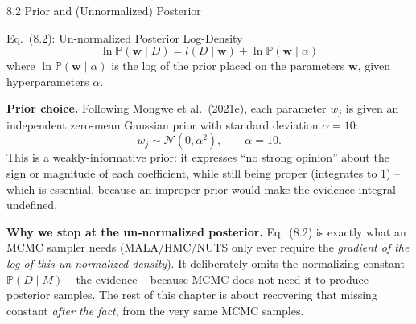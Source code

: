 \documentclass[aspectratio=169,10pt]{beamer}
\begin{document}
\begin{frame}[allowframebreaks]{8.2 Prior and (Unnormalized) Posterior}

\begin{block}{Eq.\ (8.2): Un-normalized Posterior Log-Density}
\[
\ln \mathbb{P}(\mathbf{w} \mid D) = l(D \mid \mathbf{w}) + \ln \mathbb{P}(\mathbf{w} \mid \alpha)
\]
where $\ln \mathbb{P}(\mathbf{w}\mid\alpha)$ is the log of the prior placed on the parameters $\mathbf{w}$, given hyperparameters $\alpha$.
\end{block}

\textbf{Prior choice.} Following Mongwe et al.\ (2021e), each parameter $w_j$ is given an independent zero-mean Gaussian prior with standard deviation $\alpha = 10$:
\[
w_j \sim \mathcal{N}(0, \alpha^2), \qquad \alpha = 10.
\]
This is a weakly-informative prior: it expresses ``no strong opinion'' about the sign or magnitude of each coefficient, while still being proper (integrates to 1) -- which is essential, because an improper prior would make the evidence integral undefined.

\framebreak

\textbf{Why we stop at the un-normalized posterior.} Eq.\ (8.2) is exactly what an MCMC sampler needs (MALA/HMC/NUTS only ever require the \emph{gradient of the log of this un-normalized density}). It deliberately omits the normalizing constant $\mathbb{P}(D\mid M)$ -- the evidence -- because MCMC does not need it to produce posterior samples. The rest of this chapter is about recovering that missing constant \emph{after the fact}, from the very same MCMC samples.

\end{frame}
\end{document}

